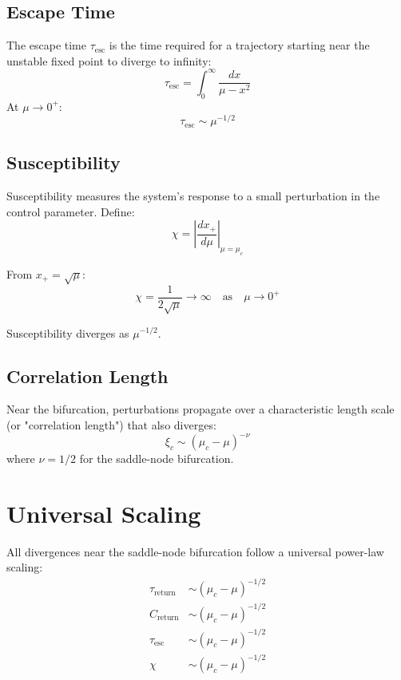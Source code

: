 \documentclass[12pt]{article}
\begin{document}
\subsection{Escape Time}

The escape time $\tau_{\text{esc}}$ is the time required for a trajectory starting near the unstable fixed point to diverge to infinity:
\begin{equation}
\tau_{\text{esc}} = \int_0^\infty \frac{dx}{\mu - x^2}
\end{equation}
At $\mu \to 0^+$:
\begin{equation}
\tau_{\text{esc}} \sim \mu^{-1/2}
\end{equation}

\subsection{Susceptibility}

Susceptibility measures the system's response to a small perturbation in the control parameter. Define:
\begin{equation}
\chi = \left| \frac{dx_+}{d\mu} \right|_{\mu = \mu_c}
\end{equation}

From $x_+ = \sqrt{\mu}$:
\begin{equation}
\chi = \frac{1}{2\sqrt{\mu}} \to \infty \quad \text{as} \quad \mu \to 0^+
\end{equation}

Susceptibility diverges as $\mu^{-1/2}$.

\subsection{Correlation Length}

Near the bifurcation, perturbations propagate over a characteristic length scale (or "correlation length") that also diverges:
\begin{equation}
\xi_c \sim (\mu_c - \mu)^{-\nu}
\end{equation}
where $\nu = 1/2$ for the saddle-node bifurcation.

\section{Universal Scaling}

All divergences near the saddle-node bifurcation follow a universal power-law scaling:
\begin{align}
\tau_{\text{return}} &\sim (\mu_c - \mu)^{-1/2} \\
C_{\text{return}} &\sim (\mu_c - \mu)^{-1/2} \\
\tau_{\text{esc}} &\sim (\mu_c - \mu)^{-1/2} \\
\chi &\sim (\mu_c - \mu)^{-1/2}
\end{align}
\end{document}
